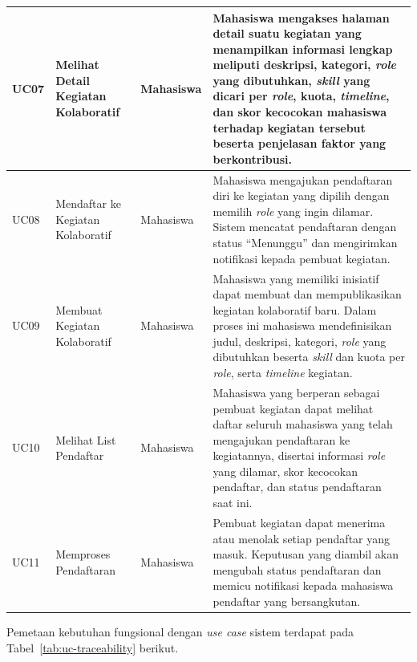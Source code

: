 \begin{longtable}{p{1.5cm} p{4.5cm} p{2cm} p{\dimexpr\linewidth-8cm-8\tabcolsep\relax}}
  \midrule
  UC07 & Melihat Detail Kegiatan Kolaboratif & Mahasiswa & Mahasiswa mengakses halaman detail suatu kegiatan yang menampilkan informasi lengkap meliputi deskripsi, kategori, \emph{role} yang dibutuhkan, \emph{skill} yang dicari per \emph{role}, kuota, \emph{timeline}, dan skor kecocokan mahasiswa terhadap kegiatan tersebut beserta penjelasan faktor yang berkontribusi. \\
  \midrule
  UC08 & Mendaftar ke Kegiatan Kolaboratif & Mahasiswa & Mahasiswa mengajukan pendaftaran diri ke kegiatan yang dipilih dengan memilih \emph{role} yang ingin dilamar. Sistem mencatat pendaftaran dengan status ``Menunggu'' dan mengirimkan notifikasi kepada pembuat kegiatan. \\
  \midrule
  UC09 & Membuat Kegiatan Kolaboratif & Mahasiswa & Mahasiswa yang memiliki inisiatif dapat membuat dan mempublikasikan kegiatan kolaboratif baru. Dalam proses ini mahasiswa mendefinisikan judul, deskripsi, kategori, \emph{role} yang dibutuhkan beserta \emph{skill} dan kuota per \emph{role}, serta \emph{timeline} kegiatan. \\
  \midrule
  UC10 & Melihat List Pendaftar & Mahasiswa & Mahasiswa yang berperan sebagai pembuat kegiatan dapat melihat daftar seluruh mahasiswa yang telah mengajukan pendaftaran ke kegiatannya, disertai informasi \emph{role} yang dilamar, skor kecocokan pendaftar, dan status pendaftaran saat ini. \\
  \midrule
  UC11 & Memproses Pendaftaran & Mahasiswa & Pembuat kegiatan dapat menerima atau menolak setiap pendaftar yang masuk. Keputusan yang diambil akan mengubah status pendaftaran dan memicu notifikasi kepada mahasiswa pendaftar yang bersangkutan. \\
\end{longtable}

Pemetaan kebutuhan fungsional dengan \emph{use case} sistem terdapat pada Tabel~\ref{tab:uc-traceability} berikut.

